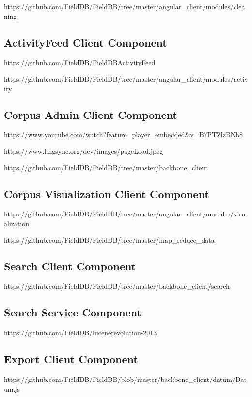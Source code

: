 \documentclass[12pt]{article}
\begin{document}
https://github.com/FieldDB/FieldDB/tree/master/angular\_client/modules/cleaning

\subsection{ActivityFeed Client Component}

https://github.com/FieldDB/FieldDBActivityFeed


https://github.com/FieldDB/FieldDB/tree/master/angular\_client/modules/activity

\subsection{Corpus Admin Client Component}

https://www.youtube.com/watch?feature=player\_embedded\&v=B7PTZlzBNb8

https://www.lingsync.org/dev/images/pageLoad.jpeg

https://github.com/FieldDB/FieldDB/tree/master/backbone\_client

\subsection{Corpus Visualization Client Component}

https://github.com/FieldDB/FieldDB/tree/master/angular\_client/modules/visualization

https://github.com/FieldDB/FieldDB/tree/master/map_reduce\_data

\subsection{Search Client Component}


https://github.com/FieldDB/FieldDB/tree/master/backbone_client/search


\subsection{Search Service Component}

https://github.com/FieldDB/lucenerevolution-2013


\subsection{Export Client Component}

https://github.com/FieldDB/FieldDB/blob/master/backbone_client/datum/Datum.js
\end{document}
